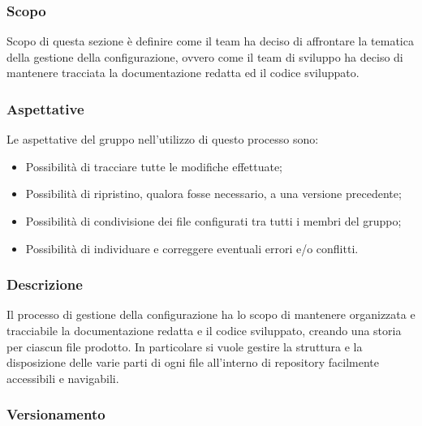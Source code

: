 \subsubsection{Scopo}
Scopo di questa sezione è definire come il team \groupName{} ha deciso di affrontare la tematica della gestione della configurazione, ovvero come il team di sviluppo ha deciso di mantenere tracciata la documentazione redatta ed il codice sviluppato.

\subsubsection{Aspettative}
Le aspettative del gruppo \groupName{} nell'utilizzo di questo processo sono:
\begin{itemize}
    \item Possibilità di tracciare tutte le modifiche effettuate;
    \item Possibilità di ripristino, qualora fosse necessario, a una versione precedente;
    \item Possibilità di condivisione dei file configurati tra tutti i membri del gruppo;
    \item Possibilità di individuare e correggere eventuali errori e/o conflitti.
\end{itemize}

\subsubsection{Descrizione}
Il processo di gestione della configurazione ha lo scopo di mantenere organizzata e tracciabile la documentazione redatta e il codice sviluppato, creando una storia per ciascun file prodotto.
In particolare si vuole gestire la struttura e la disposizione delle varie parti di ogni file all'interno di repository\glo{} facilmente accessibili e navigabili.

\subsubsection{Versionamento} \label{sssec:versionamento}
